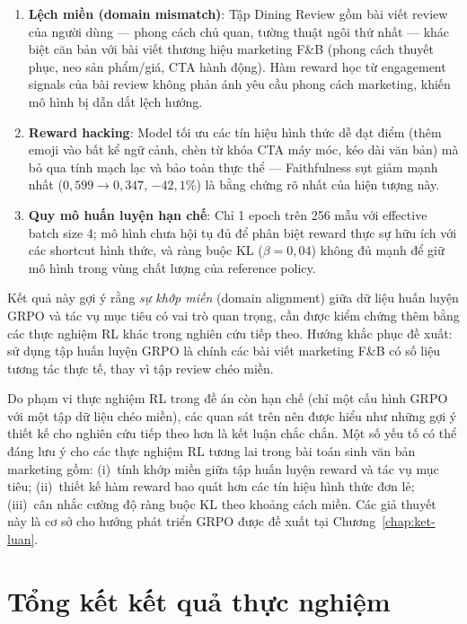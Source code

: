 \begin{enumerate}
  \item \textbf{Lệch miền (domain mismatch)}: Tập Dining Review gồm
    bài viết review của người dùng --- phong cách chủ quan, tường thuật
    ngôi thứ nhất --- khác biệt căn bản với bài viết thương hiệu
    marketing F\&B (phong cách thuyết phục, neo sản phẩm/giá, CTA hành
    động). Hàm reward học từ engagement signals của bài review không
    phản ánh yêu cầu phong cách marketing, khiến mô hình bị dẫn dắt
    lệch hướng.
  \item \textbf{Reward hacking}: Model tối ưu các tín hiệu hình thức
    dễ đạt điểm (thêm emoji vào bất kể ngữ cảnh, chèn từ khóa CTA
    máy móc, kéo dài văn bản) mà bỏ qua tính mạch lạc và bảo toàn
    thực thể --- Faithfulness sụt giảm mạnh nhất ($0{,}599 \to 0{,}347$,
    $-42{,}1\%$) là bằng chứng rõ nhất của hiện tượng này.
  \item \textbf{Quy mô huấn luyện hạn chế}: Chỉ 1 epoch trên 256 mẫu
    với effective batch size 4; mô hình chưa hội tụ đủ để phân biệt
    reward thực sự hữu ích với các shortcut hình thức, và ràng buộc KL
    ($\beta = 0{,}04$) không đủ mạnh để giữ mô hình trong vùng chất
    lượng của reference policy.
\end{enumerate}

Kết quả này gợi ý rằng \emph{sự khớp miền} (domain alignment) giữa
dữ liệu huấn luyện GRPO và tác vụ mục tiêu có vai trò quan trọng, cần
được kiểm chứng thêm bằng các thực nghiệm RL khác trong nghiên cứu
tiếp theo. Hướng khắc phục đề xuất: sử dụng tập huấn luyện GRPO là
chính các bài viết marketing F\&B có số liệu tương tác thực tế, thay
vì tập review chéo miền.

Do phạm vi thực nghiệm RL trong đề án còn hạn chế (chỉ một cấu hình
GRPO với một tập dữ liệu chéo miền), các quan sát trên nên được hiểu
như những gợi ý thiết kế cho nghiên cứu tiếp theo hơn là kết luận chắc
chắn. Một số yếu tố có thể đáng lưu ý cho các thực nghiệm RL tương lai
trong bài toán sinh văn bản marketing gồm: (i)~tính khớp miền giữa
tập huấn luyện reward và tác vụ mục tiêu; (ii)~thiết kế hàm reward bao
quát hơn các tín hiệu hình thức đơn lẻ; (iii)~cân nhắc cường độ ràng
buộc KL theo khoảng cách miền. Các giả thuyết này là cơ sở cho hướng
phát triển GRPO được đề xuất tại Chương~\ref{chap:ket-luan}.

\section{Tổng kết kết quả thực nghiệm}
\label{sec:tong-ket-thuc-nghiem}

